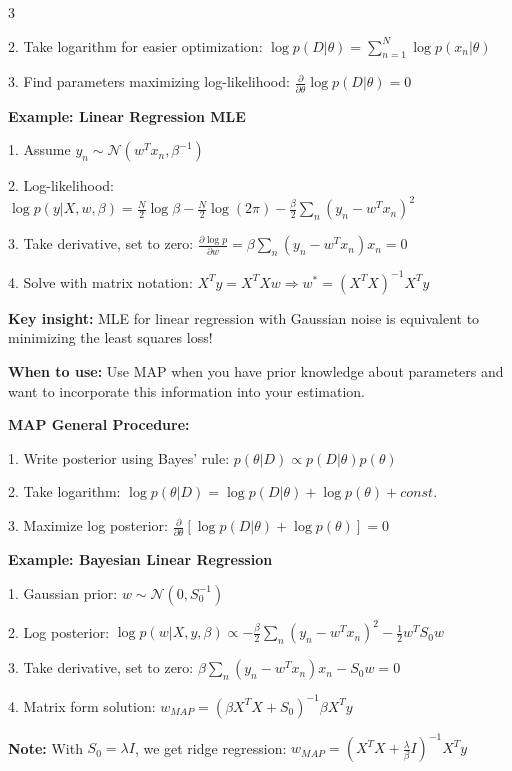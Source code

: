 \documentclass[10pt,landscape]{article}
\begin{document}
\begin{multicols}{3}
\begin{tcolorbox}[breakable, title=1.2 Maximum Likelihood Estimation, colback=regression]
2. Take logarithm for easier optimization:
$\log p(D|\theta) = \sum_{n=1}^{N} \log p(x_n|\theta)$

3. Find parameters maximizing log-likelihood:
$\frac{\partial}{\partial \theta}\log p(D|\theta) = 0$

\textbf{Example: Linear Regression MLE}

1. Assume $y_n \sim \mathcal{N}(w^T x_n, \beta^{-1})$

2. Log-likelihood:
$\log p(y|X, w, \beta) = \frac{N}{2}\log\beta - \frac{N}{2}\log(2\pi) - \frac{\beta}{2}\sum_{n}(y_n - w^Tx_n)^2$

3. Take derivative, set to zero:
$\frac{\partial \log p}{\partial w} = \beta \sum_{n}(y_n - w^Tx_n)x_n = 0$

4. Solve with matrix notation:
$X^Ty = X^TXw \Rightarrow w^* = (X^TX)^{-1}X^Ty$

\textbf{Key insight:} MLE for linear regression with Gaussian noise is equivalent to minimizing the least squares loss!
\end{tcolorbox}

\begin{tcolorbox}[breakable, title=1.3 Maximum A Posteriori Estimation, colback=regression]
\textbf{When to use:} Use MAP when you have prior knowledge about parameters and want to incorporate this information into your estimation.

\textbf{MAP General Procedure:}

1. Write posterior using Bayes' rule:
$p(\theta|D) \propto p(D|\theta)p(\theta)$

2. Take logarithm:
$\log p(\theta|D) = \log p(D|\theta) + \log p(\theta) + const.$

3. Maximize log posterior:
$\frac{\partial}{\partial \theta}[\log p(D|\theta) + \log p(\theta)] = 0$

\textbf{Example: Bayesian Linear Regression}

1. Gaussian prior: $w \sim \mathcal{N}(0, S_0^{-1})$

2. Log posterior:
$\log p(w|X,y,\beta) \propto -\frac{\beta}{2}\sum_n(y_n - w^Tx_n)^2 - \frac{1}{2}w^TS_0w$

3. Take derivative, set to zero:
$\beta\sum_n(y_n - w^Tx_n)x_n - S_0w = 0$

4. Matrix form solution:
$w_{MAP} = (\beta X^TX + S_0)^{-1}\beta X^Ty$

\textbf{Note:} With $S_0 = \lambda I$, we get ridge regression: 
$w_{MAP} = (X^TX + \frac{\lambda}{\beta}I)^{-1}X^Ty$
\end{tcolorbox}


\end{multicols}
\end{document}
